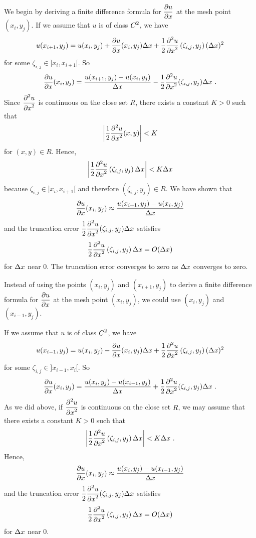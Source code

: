 We begin by deriving a finite difference formula for
$\displaystyle \frac{\partial{u}}{\partial{x}}$ at the mesh point $(x_i,y_j)$.
If we assume that $u$ is of class $\displaystyle C^2$, we have
\[
u(x_{i+1},y_j) = u(x_i,y_j) + \frac{\partial{u}}{\partial{x}}(x_i,y_j) \Delta{x}
+ \frac{1}{2} \frac{\displaystyle \partial^{2}{u}} {\displaystyle \partial{x}^{2}}\left(\zeta_{i,j},y_j\right) (\Delta{x})^2
\]
for some $\zeta_{i,j} \in ]x_i,x_{i+1}[$.  So
\begin{equation} \label{fdm_foD}
\frac{\partial{u}}{\partial{x}}(x_i,y_j) = \frac{u(x_{i+1},y_j)- u(x_i,y_j)}{\Delta{x}}
- \frac{1}{2} \frac{\displaystyle \partial^{2}{u}} {\displaystyle \partial{x}^{2}}(\zeta_{i,j},y_j) \Delta{x} \ .
\end{equation}
Since $\displaystyle \frac{\displaystyle \partial^{2}{u}} {\displaystyle \partial{x}^{2}}$ is continuous on the close set
$R$, there exists a constant $K >0$ such that 
\[
\left| \frac{1}{2} \frac{\displaystyle \partial^{2}{u}} {\displaystyle \partial{x}^{2}}(x,y) \right| < K
\]
for $(x,y) \in R$.  Hence,
\[
\left| \frac{1}{2} \frac{\displaystyle \partial^{2}{u}} {\displaystyle \partial{x}^{2}}\left(\zeta_{i,j},y_j\right) \Delta{x} \right|
< K \Delta{x}
\]
because $\zeta_{i,j} \in ]x_i,x_{i+1}[$ and therefore $(\zeta_{i,j},y_j) \in R$.
We have shown that
\begin{equation} \label{fdm_simple}
\frac{\partial{u}}{\partial{x}}(x_i,y_j) \approx \frac{u(x_{i+1},y_j)- u(x_i,y_j)}{\Delta{x}}
\end{equation}
and the truncation error
$\displaystyle \frac{1}{2} \frac{\displaystyle \partial^{2}{u}} {\displaystyle \partial{x}^{2}}(\zeta_{i,j},y_j) \Delta{x}$ satisfies
\[
\frac{1}{2} \frac{\displaystyle \partial^{2}{u}} {\displaystyle \partial{x}^{2}}\left(\zeta_{i,j},y_j\right) \Delta{x} = O(\Delta{x})
\]
for $\Delta{x}$ near $0$.  The truncation error converges to zero as
$\Delta{x}$ converges to zero.

Instead of using the points $(x_i,y_j)$ and $(x_{i+1},y_j)$ to
derive a finite difference formula for $\displaystyle \frac{\partial{u}}{\partial{x}}$ at
the mesh point $(x_i,y_j)$, we could use $(x_i,y_j)$ and
$(x_{i-1},y_j)$.

If we assume that $u$ is of class $\displaystyle C^2$, we have
\[
u(x_{i-1},y_j) = u(x_i,y_j) - \frac{\partial{u}}{\partial{x}}(x_i,y_j) \Delta{x}
+ \frac{1}{2} \frac{\displaystyle \partial^{2}{u}} {\displaystyle \partial{x}^{2}}\left(\zeta_{i,j},y_j\right) (\Delta{x})^2
\]
for some $\zeta_{i,j} \in ]x_{i-1},x_i[$.  So
\begin{equation} \label{fdm_foDM}
\frac{\partial{u}}{\partial{x}}(x_i,y_j) = \frac{u(x_i,y_j)- u(x_{i-1},y_j)}{\Delta{x}}
+ \frac{1}{2} \frac{\displaystyle \partial^{2}{u}} {\displaystyle \partial{x}^{2}}(\zeta_{i,j},y_j) \Delta{x} \ .
\end{equation}
As we did above, if $\displaystyle \frac{\displaystyle \partial^{2}{u}} {\displaystyle \partial{x}^{2}}$ is continuous on
the close set $R$, we may assume that there exists a constant $K >0$
such that
\[
\left| \frac{1}{2} \frac{\displaystyle \partial^{2}{u}} {\displaystyle \partial{x}^{2}}\left(\zeta_{i,j},y_j\right) \Delta{x} \right|
< K \Delta{x} \ .
\]
Hence,
\begin{equation} \label{fdm_simpleM}
\frac{\partial{u}}{\partial{x}}(x_i,y_j) \approx \frac{u(x_i,y_j)- u(x_{i-1},y_j)}{\Delta{x}}
\end{equation}
and the truncation error
$\displaystyle \frac{1}{2} \frac{\displaystyle \partial^{2}{u}} {\displaystyle \partial{x}^{2}}(\zeta_{i,j},y_j) \Delta{x}$ satisfies
\[
\frac{1}{2} \frac{\displaystyle \partial^{2}{u}} {\displaystyle \partial{x}^{2}}\left(\zeta_{i,j},y_j\right) \Delta{x} = O(\Delta{x})
\]
for $\Delta{x}$ near $0$.

